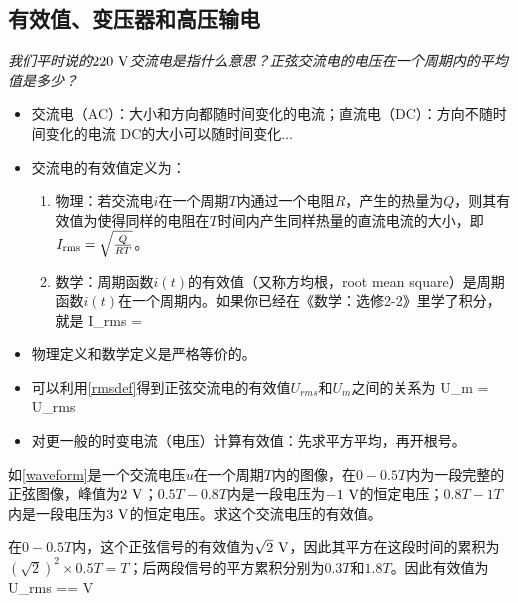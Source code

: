 \documentclass[a4paper,9pt]{ctexart}
\begin{document}
\subsection{有效值、变压器和高压输电}
\emph{我们平时说的$220{\rm \ V}$交流电是指什么意思？正弦交流电的电压在一个周期内的平均值是多少？}
\begin{itemize}
\item
交流电（AC）：大小和方向都随时间变化的电流；直流电（DC）：方向不随时间变化的电流 \so DC的大小可以随时间变化...
\item
交流电的有效值定义为：
\begin{enumerate}
\item
物理：若交流电$i$在一个周期$T$内通过一个电阻$R$，产生的热量为$Q$，则其有效值为使得同样的电阻在$T$时间内产生同样热量的直流电流的大小，即$I_{\rm rms} = \sqrt{\frac{Q}{RT}}$。
\item
数学：周期函数$i(t)$的有效值（又称方均根，root mean square）是周期函数$i(t)$在一个周期内。如果你已经在《数学：选修2-2》里学了积分，就是
\beq \label{rmsdef}
I_{rms} = 
\eeq
\end{enumerate}
\item
物理定义和数学定义是严格等价的。
\item
可以利用\cref{rmsdef}得到正弦交流电的有效值$U_{rms}$和$U_m$之间的关系为
\beq
U_m =  U_{rms}
\eeq
\item
对更一般的时变电流（电压）计算有效值：先求平方平均，再开根号。
\end{itemize}
\begin{eg}
如\cref{waveform}是一个交流电压$u$在一个周期$T$内的图像，在$0-0.5T$内为一段完整的正弦图像，峰值为$2{\rm \ V}$；$0.5T-0.8T$内是一段电压为$-1{\rm \ V}$的恒定电压；$0.8T-1T$内是一段电压为$3{\rm \ V}$的恒定电压。求这个交流电压的有效值。
\end{eg}
\begin{ans}
在$0-0.5T$内，这个正弦信号的有效值为$\sqrt 2{\rm \ V}$，因此其平方在这段时间的累积为$(\sqrt 2 )^2\times 0.5 T = T$；后两段信号的平方累积分别为$0.3T$和$1.8T$。因此有效值为
\beq
U_{rms} == \unit V
\eeq
\end{ans}
\end{document}
